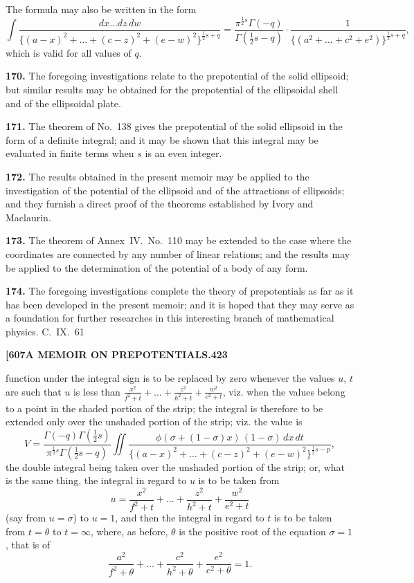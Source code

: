 \documentclass[11pt,a4paper]{article}
\begin{document}
{The formula may also be written in the form
\[
\int \frac{dx\ldots dz\, dw}{\{(a-x)^2 + \ldots + (c-z)^2 + (e-w)^2\}^{\frac{1}{2}s+q}} = \frac{\pi^{\frac{1}{2}s}\Gamma(-q)}{\Gamma(\frac{1}{2}s-q)} \cdot \frac{1}{\{(a^2 + \ldots + c^2 + e^2)\}^{\frac{1}{2}s+q}},
\]
which is valid for all values of $q$.

\medskip
\noindent\textbf{170.}
The foregoing investigations relate to the prepotential of the solid ellipsoid; but similar results may be obtained for the prepotential of the ellipsoidal shell and of the ellipsoidal plate.

\medskip
\noindent\textbf{171.}
The theorem of No.~138 gives the prepotential of the solid ellipsoid in the form of a definite integral; and it may be shown that this integral may be evaluated in finite terms when $s$ is an even integer.

\medskip
\noindent\textbf{172.}
The results obtained in the present memoir may be applied to the investigation of the potential of the ellipsoid and of the attractions of ellipsoids; and they furnish a direct proof of the theorems established by Ivory and Maclaurin.

\medskip
\noindent\textbf{173.}
The theorem of Annex~IV.\ No.~110 may be extended to the case where the coordinates are connected by any number of linear relations; and the results may be applied to the determination of the potential of a body of any form.

\medskip
\noindent\textbf{174.}
The foregoing investigations complete the theory of prepotentials as far as it has been developed in the present memoir; and it is hoped that they may serve as a foundation for further researches in this interesting branch of mathematical physics.
\hfill C.~IX.\ 61

\newpage
\noindent\textbf{[607}\hspace{\fill}\textbf{A MEMOIR ON PREPOTENTIALS.}\hspace{\fill}\textbf{423}

function under the integral sign is to be replaced by zero whenever the values $u$, $t$ are such that $u$ is less than $\frac{x^2}{f^2+t} + \ldots + \frac{z^2}{h^2+t} + \frac{w^2}{e^2+t}$, viz. when the values belong to a point in the shaded portion of the strip; the integral is therefore to be extended only over the unshaded portion of the strip; viz. the value is
\[
V = \frac{\Gamma(-q)\Gamma(\frac{1}{2}s)}{\pi^{\frac{1}{2}s}\Gamma(\frac{1}{2}s-q)} \iint \frac{\phi(\sigma + (1-\sigma)x)\, (1-\sigma)\, dx\, dt}{\{(a-x)^2 + \ldots + (c-z)^2 + (e-w)^2\}^{\frac{1}{2}s-p}},
\]
the double integral being taken over the unshaded portion of the strip; or, what is the same thing, the integral in regard to $u$ is to be taken from
\[
u = \frac{x^2}{f^2+t} + \ldots + \frac{z^2}{h^2+t} + \frac{w^2}{e^2+t}
\]
(say from $u = \sigma$) to $u = 1$, and then the integral in regard to $t$ is to be taken from $t = \theta$ to $t = \infty$, where, as before, $\theta$ is the positive root of the equation $\sigma = 1$, that is of
\[
\frac{a^2}{f^2+\theta} + \ldots + \frac{c^2}{h^2+\theta} + \frac{e^2}{e^2+\theta} = 1.
\]

}
\end{document}
